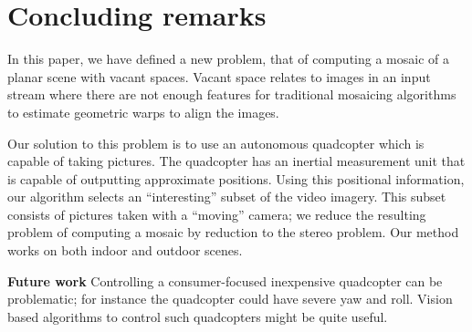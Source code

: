 \documentclass[10pt,twocolumn,letterpaper]{article}
\begin{document}


\section{Concluding remarks}

In this paper, we have defined a new problem, that of computing a
mosaic of a planar scene with vacant spaces.  Vacant space relates to images
in an input stream where there are not enough features for traditional
mosaicing algorithms to estimate geometric warps to align the images.

Our solution to this problem is to use an autonomous quadcopter which
is capable of taking pictures.  The quadcopter has an inertial
measurement unit that is capable of outputting approximate
positions. Using this positional information, our algorithm selects an
``interesting'' subset of the video imagery.  This subset consists of
pictures taken with a ``moving'' camera; we reduce the resulting
problem of computing a mosaic by reduction to the stereo problem.  Our
method works on both indoor and outdoor scenes.

{\bf Future work} Controlling a consumer-focused inexpensive
quadcopter can be problematic; for instance the quadcopter could have
severe yaw and roll.  Vision based algorithms to control such
quadcopters might be quite useful.




\end{document}
